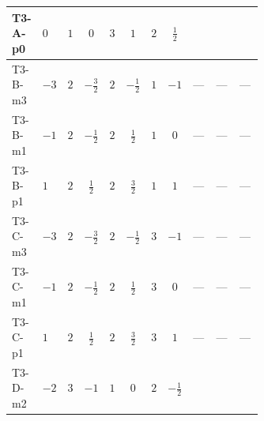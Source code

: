 \documentclass[8pt]{article}
\begin{document}
\begin{landscape}
\begin{longtable}{@{}llcccccc >{\raggedright\arraybackslash}p{0.21\linewidth} >{\raggedright\arraybackslash}p{0.21\linewidth} >{\raggedright\arraybackslash}p{0.21\linewidth}@{}}
\midrule
T3-A-p0 & $0$ & $1$ & $0$ & $3$ & $1$ & $2$ & $\frac{1}{2}$ & \scriptsize\adjustbox{max width=\linewidth}{$\begin{gathered} \frac{1}{4} (2 \left(\left({y_1}\right)^{T}\,\left({y_1}\right)^{*}\,{M_F}\right)_{ij}+3 \left({M_F}\,\left({y_2}\right)^{\dagger}\,{y_2}\right)_{ij})\end{gathered}$} & \scriptsize\adjustbox{max width=\linewidth}{$\begin{gathered} -\frac{9}{2} {g_2}^2 \left({M_F}\right)_{ij}\end{gathered}$} & \scriptsize\adjustbox{max width=\linewidth}{$\begin{gathered} -\frac{3}{2} {g_1}^2 \left({M_F}\right)_{ij}\end{gathered}$} \\
\midrule
T3-B-m3 & $-3$ & $2$ & $-\frac{3}{2}$ & $2$ & $-\frac{1}{2}$ & $1$ & $-1$ & --- & --- & --- \\
\midrule
T3-B-m1 & $-1$ & $2$ & $-\frac{1}{2}$ & $2$ & $\frac{1}{2}$ & $1$ & $0$ & --- & --- & --- \\
\midrule
T3-B-p1 & $1$ & $2$ & $\frac{1}{2}$ & $2$ & $\frac{3}{2}$ & $1$ & $1$ & --- & --- & --- \\
\midrule
T3-C-m3 & $-3$ & $2$ & $-\frac{3}{2}$ & $2$ & $-\frac{1}{2}$ & $3$ & $-1$ & --- & --- & --- \\
\midrule
T3-C-m1 & $-1$ & $2$ & $-\frac{1}{2}$ & $2$ & $\frac{1}{2}$ & $3$ & $0$ & --- & --- & --- \\
\midrule
T3-C-p1 & $1$ & $2$ & $\frac{1}{2}$ & $2$ & $\frac{3}{2}$ & $3$ & $1$ & --- & --- & --- \\
\midrule
T3-D-m2 & $-2$ & $3$ & $-1$ & $1$ & $0$ & $2$ & $-\frac{1}{2}$ & \scriptsize\adjustbox{max width=\linewidth}{$\begin{gathered} \frac{1}{4} (3 \left(\left({y_1}\right)^{T}\,\left({y_1}\right)^{*}\,{M_F}\right)_{ij}+2 \left({M_F}\,\left({y_2}\right)^{\dagger}\,{y_2}\right)_{ij})\end{gathered}$} & \scriptsize\adjustbox{max width=\linewidth}{$\begin{gathered} -\frac{9}{2} {g_2}^2 \left({M_F}\right)_{ij}\end{gathered}$} & \scriptsize\adjustbox{max width=\linewidth}{$\begin{gathered} -\frac{3}{2} {g_1}^2 \left({M_F}\right)_{ij}\end{gathered}$} \\
\midrule

\end{longtable}
\end{landscape}
\end{document}
